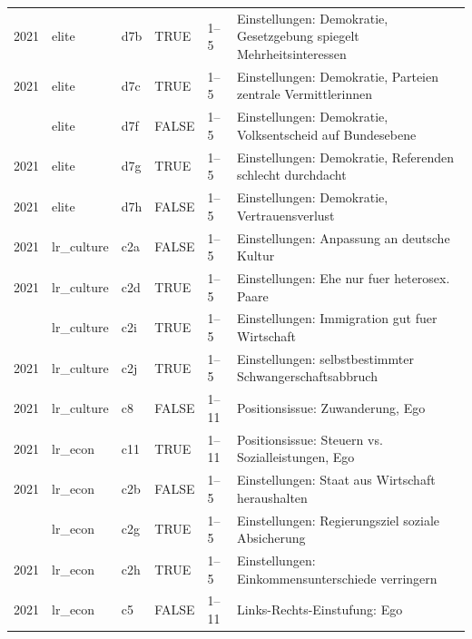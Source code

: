 \begin{longtable}[t]{rlllll}
2021 & elite & d7b & TRUE & 1–5 & Einstellungen: Demokratie, Gesetzgebung spiegelt Mehrheitsinteressen\\
2021 & elite & d7c & TRUE & 1–5 & Einstellungen: Demokratie, Parteien zentrale Vermittlerinnen\\
\addlinespace
2021 & elite & d7f & FALSE & 1–5 & Einstellungen: Demokratie, Volksentscheid auf Bundesebene\\
2021 & elite & d7g & TRUE & 1–5 & Einstellungen: Demokratie, Referenden schlecht durchdacht\\
2021 & elite & d7h & FALSE & 1–5 & Einstellungen: Demokratie, Vertrauensverlust\\
2021 & lr\_culture & c2a & FALSE & 1–5 & Einstellungen: Anpassung an deutsche Kultur\\
2021 & lr\_culture & c2d & TRUE & 1–5 & Einstellungen: Ehe nur fuer heterosex. Paare\\
\addlinespace
2021 & lr\_culture & c2i & TRUE & 1–5 & Einstellungen: Immigration gut fuer Wirtschaft\\
2021 & lr\_culture & c2j & TRUE & 1–5 & Einstellungen: selbstbestimmter Schwangerschaftsabbruch\\
2021 & lr\_culture & c8 & FALSE & 1–11 & Positionsissue: Zuwanderung, Ego\\
2021 & lr\_econ & c11 & TRUE & 1–11 & Positionsissue: Steuern vs. Sozialleistungen, Ego\\
2021 & lr\_econ & c2b & FALSE & 1–5 & Einstellungen: Staat aus Wirtschaft heraushalten\\
\addlinespace
2021 & lr\_econ & c2g & TRUE & 1–5 & Einstellungen: Regierungsziel soziale Absicherung\\
2021 & lr\_econ & c2h & TRUE & 1–5 & Einstellungen: Einkommensunterschiede verringern\\
2021 & lr\_econ & c5 & FALSE & 1–11 & Links-Rechts-Einstufung: Ego\\
\bottomrule
\end{longtable}